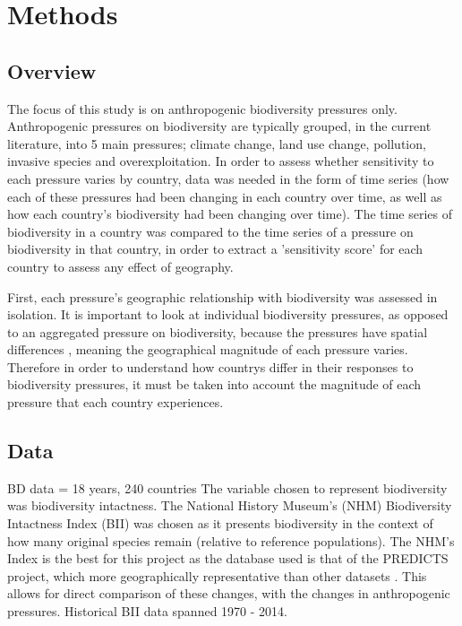 \documentclass[11pt, a4paper, titlepage]{article}
\begin{document}
    \section*{Methods}

	\subsection*{Overview}

	The focus of this study is on anthropogenic biodiversity pressures only. Anthropogenic pressures on biodiversity are typically grouped, in the current literature, into 5 main pressures; climate change, land use change, pollution, invasive species and overexploitation. In order to assess whether sensitivity to each pressure varies by country, data was needed in the form of time series (how each of these pressures had been changing in each country over time, as well as how each country's biodiversity had been changing over time). The time series of biodiversity in a country was compared to the time series of a pressure on biodiversity in that country, in order to extract a 'sensitivity score' for each country to assess any effect of geography. \newline
	
	First, each pressure's geographic relationship with biodiversity was assessed in isolation. It is important to look at individual biodiversity pressures, as opposed to an aggregated pressure on biodiversity, because the pressures have spatial differences \cite{steffen2015planetary}, meaning the geographical magnitude of each pressure varies. Therefore in order to understand how countrys differ in their responses to biodiversity pressures, it must be taken into account the magnitude of each pressure that each country experiences. \newline
	\subsection*{Data}
	
	BD data = 18 years, 240 countries
	The variable chosen to represent biodiversity was biodiversity intactness. The National History Museum's (NHM) Biodiversity Intactness Index (BII) was chosen as it presents biodiversity in the context of how many original species remain (relative to reference populations). The NHM's Index is the best for this project as the database used is that of the PREDICTS project, which more geographically representative than other datasets \cite{purvis2018modelling}. This allows for direct comparison of these changes, with the changes in anthropogenic pressures. Historical BII data spanned 1970 - 2014. \newline
	
\end{document}
